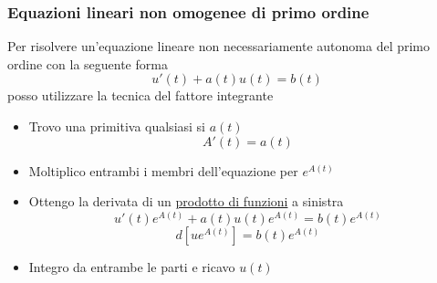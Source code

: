 \subsubsection*{Equazioni lineari non omogenee di primo ordine}
Per risolvere un'equazione lineare non necessariamente autonoma del primo ordine con la seguente forma
\[
	u'\left( t \right) + a\left( t \right) u\left( t \right) = b\left( t \right)
\]
posso utilizzare la tecnica del fattore integrante
\begin{itemize}
	\item Trovo una primitiva qualsiasi si $ a\left( t \right)  $
	      \[
		      A'\left( t \right)=a\left( t \right)
	      \]
	\item Moltiplico entrambi i membri dell'equazione per $ e^{A\left( t \right) } $
	\item Ottengo la derivata di un \underline{prodotto di funzioni} a sinistra
	      \[
		      u'\left( t \right)e^{A\left( t \right) } + a\left( t \right) u\left( t \right) e^{A\left( t \right) } = b\left( t \right) e^{A\left( t \right) }
	      \]
	      \[
		      d \left[ ue^{A\left( t \right) } \right] = b\left( t \right) e^{A\left( t \right) }
	      \]
	\item Integro da entrambe le parti e ricavo $ u\left( t \right)  $
\end{itemize}


